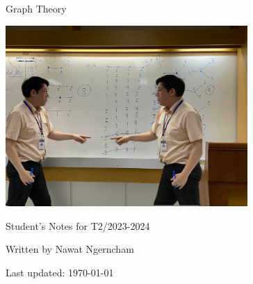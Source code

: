 \thispagestyle{empty}

\begin{center}
\vspace{5cm}

\Huge{Graph Theory}

\vspace{5em}
\begin{center}
  \includegraphics[width=0.69\textwidth]{figures/chad.png}
\end{center}
\vspace{5em}

\Large Student's Notes for {T2/2023-2024}

\Large Written by {Nawat Ngerncham}

\Large Last updated: \today
\end{center}
